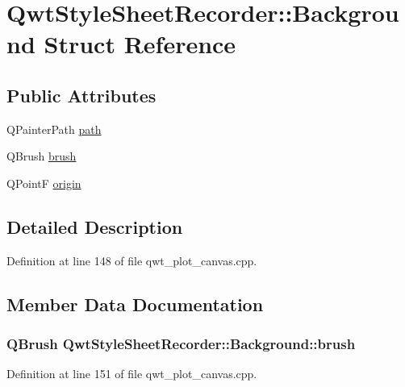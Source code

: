 \hypertarget{struct_qwt_style_sheet_recorder_1_1_background}{\section{Qwt\-Style\-Sheet\-Recorder\-:\-:Background Struct Reference}
\label{struct_qwt_style_sheet_recorder_1_1_background}
}
\subsection*{Public Attributes}
\begin{DoxyCompactItemize}
\item 
Q\-Painter\-Path \hyperlink{struct_qwt_style_sheet_recorder_1_1_background_a75b9dfbb2f4b69c141a25cd75ea49526}{path}
\item 
Q\-Brush \hyperlink{struct_qwt_style_sheet_recorder_1_1_background_ac3b25eb0028ddfe8132e2fa87fbed382}{brush}
\item 
Q\-Point\-F \hyperlink{struct_qwt_style_sheet_recorder_1_1_background_ae891862aa9d5a59c6b06bb3379a96839}{origin}
\end{DoxyCompactItemize}


\subsection{Detailed Description}


Definition at line 148 of file qwt\-\_\-plot\-\_\-canvas.\-cpp.



\subsection{Member Data Documentation}
\hypertarget{struct_qwt_style_sheet_recorder_1_1_background_ac3b25eb0028ddfe8132e2fa87fbed382}{
\subsubsection[{brush}]{\setlength{\rightskip}{0pt plus 5cm}Q\-Brush Qwt\-Style\-Sheet\-Recorder\-::\-Background\-::brush}}\label{struct_qwt_style_sheet_recorder_1_1_background_ac3b25eb0028ddfe8132e2fa87fbed382}


Definition at line 151 of file qwt\-\_\-plot\-\_\-canvas.\-cpp.

